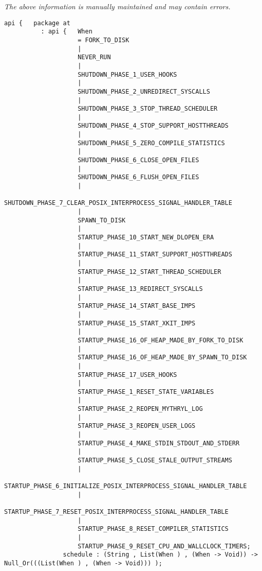 \label{api:Runtime\_Internals}

{\tiny \it The above information is manually maintained and may contain errors.}
\begin{verbatim}
api {   package at
          : api {   When
                    = FORK_TO_DISK
                    |
                    NEVER_RUN
                    |
                    SHUTDOWN_PHASE_1_USER_HOOKS
                    |
                    SHUTDOWN_PHASE_2_UNREDIRECT_SYSCALLS
                    |
                    SHUTDOWN_PHASE_3_STOP_THREAD_SCHEDULER
                    |
                    SHUTDOWN_PHASE_4_STOP_SUPPORT_HOSTTHREADS
                    |
                    SHUTDOWN_PHASE_5_ZERO_COMPILE_STATISTICS
                    |
                    SHUTDOWN_PHASE_6_CLOSE_OPEN_FILES
                    |
                    SHUTDOWN_PHASE_6_FLUSH_OPEN_FILES
                    |
                    SHUTDOWN_PHASE_7_CLEAR_POSIX_INTERPROCESS_SIGNAL_HANDLER_TABLE
                    |
                    SPAWN_TO_DISK
                    |
                    STARTUP_PHASE_10_START_NEW_DLOPEN_ERA
                    |
                    STARTUP_PHASE_11_START_SUPPORT_HOSTTHREADS
                    |
                    STARTUP_PHASE_12_START_THREAD_SCHEDULER
                    |
                    STARTUP_PHASE_13_REDIRECT_SYSCALLS
                    |
                    STARTUP_PHASE_14_START_BASE_IMPS
                    |
                    STARTUP_PHASE_15_START_XKIT_IMPS
                    |
                    STARTUP_PHASE_16_OF_HEAP_MADE_BY_FORK_TO_DISK
                    |
                    STARTUP_PHASE_16_OF_HEAP_MADE_BY_SPAWN_TO_DISK
                    |
                    STARTUP_PHASE_17_USER_HOOKS
                    |
                    STARTUP_PHASE_1_RESET_STATE_VARIABLES
                    |
                    STARTUP_PHASE_2_REOPEN_MYTHRYL_LOG
                    |
                    STARTUP_PHASE_3_REOPEN_USER_LOGS
                    |
                    STARTUP_PHASE_4_MAKE_STDIN_STDOUT_AND_STDERR
                    |
                    STARTUP_PHASE_5_CLOSE_STALE_OUTPUT_STREAMS
                    |
                    STARTUP_PHASE_6_INITIALIZE_POSIX_INTERPROCESS_SIGNAL_HANDLER_TABLE
                    |
                    STARTUP_PHASE_7_RESET_POSIX_INTERPROCESS_SIGNAL_HANDLER_TABLE
                    |
                    STARTUP_PHASE_8_RESET_COMPILER_STATISTICS
                    |
                    STARTUP_PHASE_9_RESET_CPU_AND_WALLCLOCK_TIMERS;
                schedule : (String , List(When ) , (When -> Void)) -> Null_Or(((List(When ) , (When -> Void))) );

\end{verbatim}
